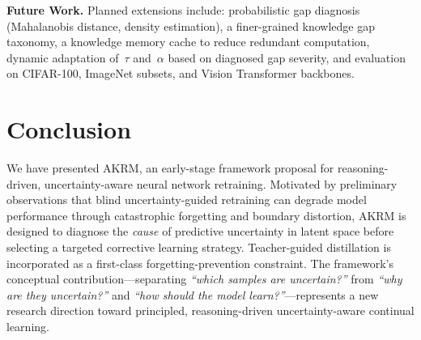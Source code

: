 \documentclass[conference]{IEEEtran}
\begin{document}
\textbf{Future Work.}
Planned extensions include: probabilistic gap diagnosis (Mahalanobis distance, density estimation), a finer-grained knowledge gap taxonomy, a knowledge memory cache to reduce redundant computation, dynamic adaptation of~$\tau$ and~$\alpha$ based on diagnosed gap severity, and evaluation on CIFAR-100, ImageNet subsets, and Vision Transformer backbones.

\section{Conclusion}

We have presented AKRM, an early-stage framework proposal for reasoning-driven, uncertainty-aware neural network retraining. Motivated by preliminary observations that blind uncertainty-guided retraining can degrade model performance through catastrophic forgetting and boundary distortion, AKRM is designed to diagnose the \emph{cause} of predictive uncertainty in latent space before selecting a targeted corrective learning strategy. Teacher-guided distillation is incorporated as a first-class forgetting-prevention constraint. The framework's conceptual contribution---separating \emph{``which samples are uncertain?''} from \emph{``why are they uncertain?''} and \emph{``how should the model learn?''}---represents a new research direction toward principled, reasoning-driven uncertainty-aware continual learning.
\end{document}
